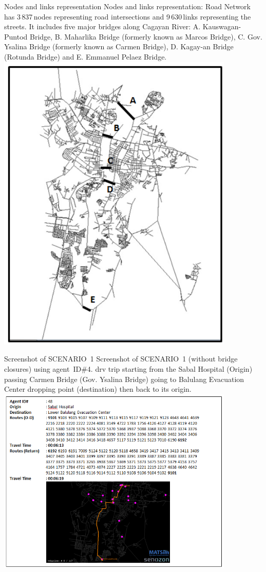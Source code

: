 \createfigure%
{Nodes and links representation}%
{Nodes and links representation: Road Network has 3\,837\,nodes representing road intersections and 9\,630\,links representing the streets. It includes five major bridges along Cagayan River: A. Kauswagan-Puntod Bridge, B. Maharlika Bridge (formerly known as Marcos Bridge), C. Gov. Ysalina Bridge (formerly known as Carmen Bridge), D. Kagay-an Bridge (Rotunda Bridge) and E. Emmanuel Pelaez Bridge.}%
{\label{fig:philippines_fig2}}%
{\includegraphics[width=0.85\textwidth, angle=0]{./using/figures/philippines_fig2.png}}%
{}

\createfigure%
{Screenshot of SCENARIO~1}%
{Screenshot of SCENARIO~1 (without bridge closures) using agent~ID\#4. \protect\gls{drv} trip starting from the Sabal Hospital (Origin) passing Carmen Bridge (Gov. Ysalina Bridge) going to Balulang Evacuation Center dropping point (destination) then back to its origin.}%
{\label{fig:philippines_fig4}}%
{\includegraphics[width=0.85\textwidth, angle=0]{./using/figures/philippines_fig4.png}}%
{}

